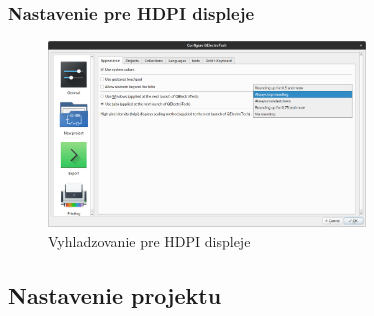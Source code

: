 \documentclass[a4paper,titlepage,11pt]{article}
\begin{document}
\subsubsection{Nastavenie pre HDPI displeje}

\begin{figure}[ht]
\centering
\includegraphics[width=0.75\textwidth]{settings-3.png}
\caption{Vyhladzovanie pre HDPI displeje}
\label{Fig:nastavenia-aplikacie}
\end{figure}

\subsection{Nastavenie projektu}
\end{document}
